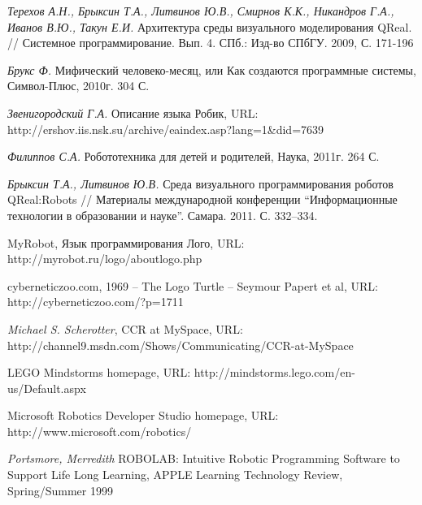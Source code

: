 \documentclass[a4paper]{article}
\begin{document}
\begin{thebibliography}{9001}

   \emph{Терехов А.Н., Брыксин Т.А., Литвинов Ю.В., Смирнов К.К., Никандров Г.А., Иванов В.Ю., Такун Е.И.} Архитектура среды визуального моделирования QReal. // Системное программирование. Вып. 4. СПб.: Изд-во СПбГУ. 2009, С. 171-196

   \emph{Брукс Ф.} Мифический человеко-месяц, или Как создаются программные системы, Символ-Плюс, 2010г. 304 С.

   \emph{Звенигородский Г.А.} Описание языка Робик, URL: http://ershov.iis.nsk.su/archive/eaindex.asp?lang=1\&did=7639 

   \emph{Филиппов С.А.} Робототехника для детей и родителей, Наука, 2011г. 264 С.

   \emph{Брыксин Т.А., Литвинов Ю.В.} Среда визуального программирования роботов QReal:Robots // Материалы международной конференции ``Информационные технологии в образовании и науке''. Самара. 2011. С. 332--334.

   MyRobot, Язык программирования Лого, URL: http://myrobot.ru/logo/aboutlogo.php   

   cyberneticzoo.com, 1969 – The Logo Turtle – Seymour Papert et al, URL: http://cyberneticzoo.com/?p=1711 

   \emph{Michael S. Scherotter}, CCR at MySpace, URL: http://channel9.msdn.com/Shows/Communicating/CCR-at-MySpace 

   LEGO Mindstorms homepage, URL: http://mindstorms.lego.com/en-us/Default.aspx

   Microsoft Robotics Developer Studio homepage, URL: http://www.microsoft.com/robotics/ 

   \emph{Portsmore, Merredith} ROBOLAB: Intuitive Robotic Programming Software to Support Life Long Learning, APPLE Learning Technology Review, Spring/Summer 1999

\end{thebibliography}
\end{document}
